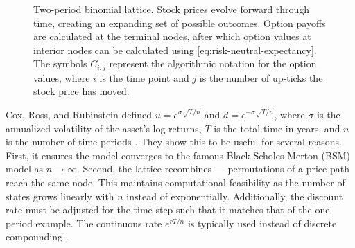 \documentclass[english,12pt,a4paper,pdftex,sci,utf8]{aaltothesis}
\begin{document}
\begin{figure}[bp]
    \centering
        \caption{Two-period binomial lattice. Stock prices evolve forward through time, creating an expanding set of possible outcomes. Option payoffs are calculated at the terminal nodes, after which option values at interior nodes can be calculated using \cref{eq:risk-neutral-expectancy}. The symbols $C_{i,j}$ represent the algorithmic notation for the option values, where $i$ is the time point and $j$ is the number of up-ticks the stock price has moved.}
    \label{fig:crr-twoperiod}
\end{figure}

Cox, Ross, and Rubinstein defined $u = e^{\sigma\sqrt{T/n}}$ and $d = e^{-\sigma\sqrt{T/n}}$, where $\sigma$ is the annualized volatility of the asset's log-returns, $T$ is the total time in years, and $n$ is the number of time periods \cite{cox1979option}. They show this to be useful for several reasons. First, it ensures the model converges to the famous Black-Scholes-Merton (BSM) model as $n \rightarrow \infty$. Second, the lattice recombines --- permutations of a price path reach the same node. This maintains computational feasibility as the number of states grows linearly with $n$ instead of exponentially. Additionally, the discount rate must be adjusted for the time step such that it matches that of the one-period example. The continuous rate $e^{rT/n}$ is typically used instead of discrete compounding \cite{hull2013fundamentals}.
\end{document}

